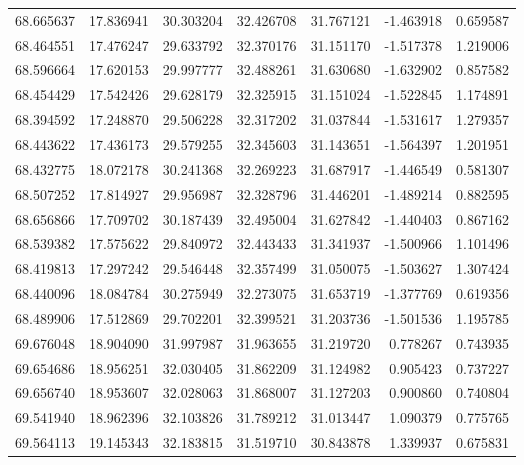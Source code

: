 \begin{tabular}{rrrrrrr}
 68.665637 &  17.836941 &         30.303204 &         32.426708 &         31.767121 & -1.463918 &  0.659587 \\
 68.464551 &  17.476247 &         29.633792 &         32.370176 &         31.151170 & -1.517378 &  1.219006 \\
 68.596664 &  17.620153 &         29.997777 &         32.488261 &         31.630680 & -1.632902 &  0.857582 \\
 68.454429 &  17.542426 &         29.628179 &         32.325915 &         31.151024 & -1.522845 &  1.174891 \\
 68.394592 &  17.248870 &         29.506228 &         32.317202 &         31.037844 & -1.531617 &  1.279357 \\
 68.443622 &  17.436173 &         29.579255 &         32.345603 &         31.143651 & -1.564397 &  1.201951 \\
 68.432775 &  18.072178 &         30.241368 &         32.269223 &         31.687917 & -1.446549 &  0.581307 \\
 68.507252 &  17.814927 &         29.956987 &         32.328796 &         31.446201 & -1.489214 &  0.882595 \\
 68.656866 &  17.709702 &         30.187439 &         32.495004 &         31.627842 & -1.440403 &  0.867162 \\
 68.539382 &  17.575622 &         29.840972 &         32.443433 &         31.341937 & -1.500966 &  1.101496 \\
 68.419813 &  17.297242 &         29.546448 &         32.357499 &         31.050075 & -1.503627 &  1.307424 \\
 68.440096 &  18.084784 &         30.275949 &         32.273075 &         31.653719 & -1.377769 &  0.619356 \\
 68.489906 &  17.512869 &         29.702201 &         32.399521 &         31.203736 & -1.501536 &  1.195785 \\
 69.676048 &  18.904090 &         31.997987 &         31.963655 &         31.219720 &  0.778267 &  0.743935 \\
 69.654686 &  18.956251 &         32.030405 &         31.862209 &         31.124982 &  0.905423 &  0.737227 \\
 69.656740 &  18.953607 &         32.028063 &         31.868007 &         31.127203 &  0.900860 &  0.740804 \\
 69.541940 &  18.962396 &         32.103826 &         31.789212 &         31.013447 &  1.090379 &  0.775765 \\
 69.564113 &  19.145343 &         32.183815 &         31.519710 &         30.843878 &  1.339937 &  0.675831 \\

\end{tabular}
